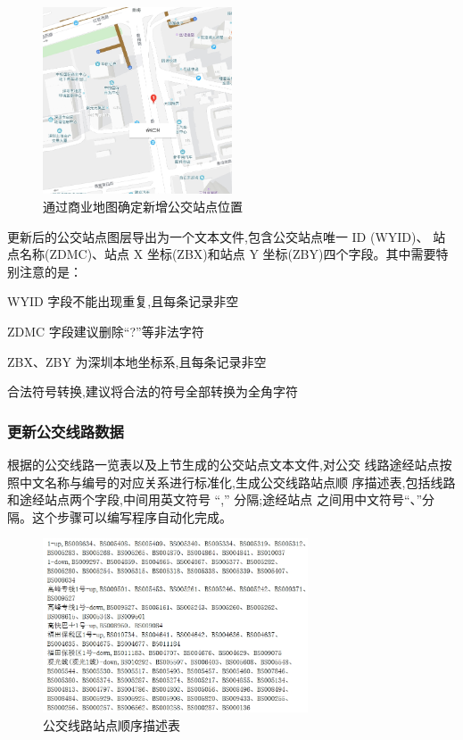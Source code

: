 \begin{figure}[!ht]
  \centering
  \includegraphics[width=0.5\textwidth]{figures/chp02_通过商业地图确定新增公交站点位置.jpg}
  \caption{通过商业地图确定新增公交站点位置\label{fig:通过商业地图确定新增公交站点位置} }
\end{figure}

更新后的公交站点图层导出为一个文本文件,包含公交站点唯一 ID (WYID)、
站点名称(ZDMC)、站点 X 坐标(ZBX)和站点 Y 坐标(ZBY)四个字段。其中需要特别注意的是：

\begin{cit}
\item WYID 字段不能出现重复,且每条记录非空
\item ZDMC 字段建议删除“?”等非法字符
\item ZBX、ZBY 为深圳本地坐标系,且每条记录非空
\item 合法符号转换,建议将合法的符号全部转换为全角字符
\end{cit}

\subsubsection{更新公交线路数据} \label{subsubsec:更新公交线路数据}
根据的公交线路一览表以及上节生成的公交站点文本文件,对公交
线路途经站点按照中文名称与编号的对应关系进行标准化,生成公交线路站点顺
序描述表,包括线路和途经站点两个字段,中间用英文符号 “,” 分隔;途经站点
之间用中文符号“、”分隔。这个步骤可以编写程序自动化完成。

\begin{figure}[ht]
  \centering
  \includegraphics[width=0.7\textwidth]{figures/chp02_公交线路站点顺序描述表.jpg}
  \caption{公交线路站点顺序描述表\label{fig:公交线路站点顺序描述表} }
\end{figure}

